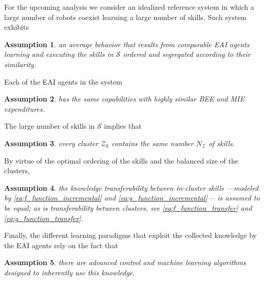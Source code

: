 \documentclass[12pt]{article}
\newtheorem{assumption}{Assumption}
\begin{document}
For the upcoming analysis we consider an idealized reference system in which a large number of robots coexist learning a large number of skills. Such system exhibits
\begin{tcolorbox}
	\begin{assumption}\label{assumption:average_behavior}
		an average behavior that results from comparable EAI agents learning and executing the skills in $\mathcal{S}$ ordered and segregated according to their similarity.
	\end{assumption}
\end{tcolorbox}
\noindent Each of the EAI agents in the system
\begin{tcolorbox}
	\begin{assumption}\label{assumption:agent_similarity}
		has the same capabilities with highly similar BEE and MIE expenditures.
	\end{assumption}
\end{tcolorbox}
\noindent The large number of skills in $\mathcal{S}$ implies that
\begin{tcolorbox}
	\begin{assumption}\label{assumption:cluster_size}
		every cluster $\mathcal{Z}_{k}$ contains the same number $N_{\mathcal{Z}} $ of skills.
	\end{assumption}
\end{tcolorbox}
\noindent By virtue of the optimal ordering of the skills and the balanced size of the clusters,
\begin{tcolorbox}
	\begin{assumption}\label{assumption:cluster_transferability}
		the knowledge transferability between in-cluster skills ---modeled by \eqref{eq:f_function_incremental} and \eqref{eq:g_function_incremental}--- is assumed to be equal; as is transferability between clusters, see \eqref{eq:f_function_transfer} and \eqref{eq:g_function_transfer}.
	\end{assumption}
\end{tcolorbox}
\noindent Finally, the different learning paradigms that exploit the collected knowledge by the EAI agents rely on the fact that
\begin{tcolorbox}
	\begin{assumption}\label{assumption:enabling_agorithms}
		there are advanced control and machine learning algorithms designed to inherently use this knowledge.
	\end{assumption}
\end{tcolorbox}
\end{document}
